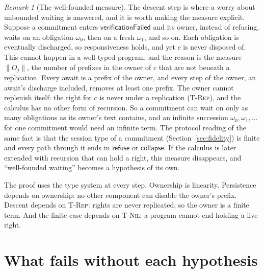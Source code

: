 \documentclass[11pt,openany]{book}
\theoremstyle{remark}
\newtheorem{remark}[theorem]{Remark}
\begin{document}
\begin{remark}[The well-founded measure]
The descent step is where a worry about unbounded waiting is answered, and
it is worth making the measure explicit. Suppose a commitment enters
$\mathsf{verificationFailed}$ and its owner, instead of refusing, waits on
an obligation $\omega_0$, then on a fresh $\omega_1$, and so on. Each
obligation is eventually discharged, so responsiveness holds, and yet $c$
is never disposed of. This cannot happen in a well-typed program, and
the reason is the measure $\|O_j\|$, the number of prefixes in the owner
of $c$ that are not beneath a replication. Every await is a prefix of the
owner, and every step of the owner, an await's discharge included,
removes at least one prefix. The owner cannot replenish itself: the right
for $c$ is never under a replication (\textsc{T-Rep}), and the calculus
has no other form of recursion. So a commitment can wait on only as many
obligations as its owner's text contains, and an infinite succession
$\omega_0,\omega_1,\ldots$ for one commitment would need an infinite
term. The protocol reading of the same fact is that the session type of a
commitment (Section~\ref{sec:fidelity}) is finite and every path through it
ends in $\mathsf{refuse}$ or $\mathsf{collapse}$. If the calculus is later
extended with recursion that can hold a right, this measure disappears,
and ``well-founded waiting'' becomes a hypothesis of its own.
\end{remark}

The proof uses the type system at every step. Ownership is linearity.
Persistence depends on ownership: no other component can disable the
owner's prefix. Descent depends on \textsc{T-Rep}: rights are never
replicated, so the owner is a finite term. And the finite case depends on
\textsc{T-Nil}: a program cannot end holding a live right.

\section{What fails without each hypothesis}
\end{document}
